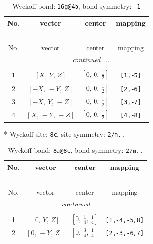 \documentclass[fleqn,8pt]{jsarticle}
\begin{document}
\begin{longtable}{cccc}
\caption{Wyckoff bond: {\tt 16g@4b}, bond symmetry: {\tt -1}}
 \\
 \hline \hline
No. & vector & center & mapping \\ \hline \endfirsthead

\multicolumn{3}{l}{\tablename\ \thetable{}} \\
 \hline \hline
No. & vector & center & mapping \\ \hline \endhead

 \hline \hline
\multicolumn{3}{r}{\footnotesize\it continued ...} \\ \endfoot

 \hline \hline
\multicolumn{3}{r}{} \\ \endlastfoot

1 & $\left[ X,\, Y,\, Z \right]$ & $\left[ 0,\, 0,\, \frac{1}{2} \right]$ & {\tt [1,-5]} \\ \hline
2 & $\left[ - X,\, - Y,\, Z \right]$ & $\left[ 0,\, 0,\, \frac{1}{2} \right]$ & {\tt [2,-6]} \\ \hline
3 & $\left[ - X,\, Y,\, - Z \right]$ & $\left[ 0,\, 0,\, \frac{1}{2} \right]$ & {\tt [3,-7]} \\ \hline
4 & $\left[ X,\, - Y,\, - Z \right]$ & $\left[ 0,\, 0,\, \frac{1}{2} \right]$ & {\tt [4,-8]} \\
\end{longtable}
* Wyckoff site: {\tt 8c}, site symmetry: {\tt 2/m..}
\renewcommand{\arraystretch}{1.2}
\begin{longtable}{cccc}
\caption{Wyckoff bond: {\tt 8a@8c}, bond symmetry: {\tt 2/m..}}
 \\
 \hline \hline
No. & vector & center & mapping \\ \hline \endfirsthead

\multicolumn{3}{l}{\tablename\ \thetable{}} \\
 \hline \hline
No. & vector & center & mapping \\ \hline \endhead

 \hline \hline
\multicolumn{3}{r}{\footnotesize\it continued ...} \\ \endfoot

 \hline \hline
\multicolumn{3}{r}{} \\ \endlastfoot

1 & $\left[ 0,\, Y,\, Z \right]$ & $\left[ 0,\, \frac{1}{4},\, \frac{1}{4} \right]$ & {\tt [1,-4,-5,8]} \\ \hline
2 & $\left[ 0,\, - Y,\, Z \right]$ & $\left[ 0,\, \frac{3}{4},\, \frac{1}{4} \right]$ & {\tt [2,-3,-6,7]} \\
\end{longtable}
\end{document}
